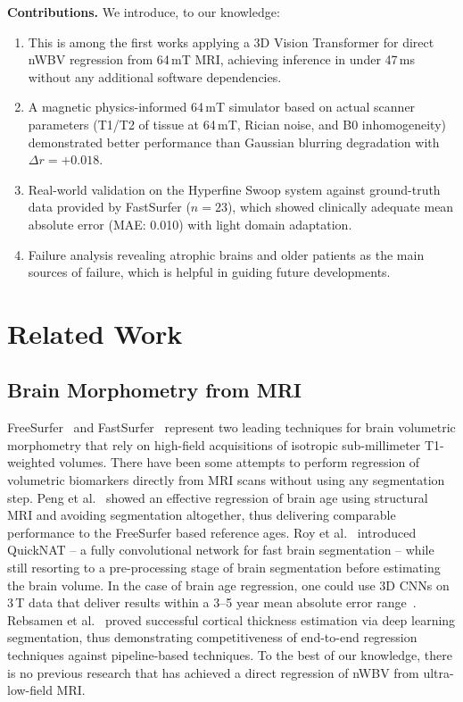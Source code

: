 \documentclass[12pt,a4paper]{article}
\begin{document}
\textbf{Contributions.} We introduce, to our knowledge:
\begin{enumerate}
  \item This is among the first works applying a 3D
        Vision Transformer for direct nWBV regression from 64\,mT MRI,
        achieving inference in under 47\,ms without any additional software
        dependencies.
  \item A magnetic physics-informed 64\,mT simulator based on actual scanner
        parameters (T1/T2 of tissue at 64\,mT, Rician noise, and B0
        inhomogeneity) demonstrated better performance than Gaussian blurring
        degradation with $\Delta r = +0.018$.
  \item Real-world validation on the Hyperfine Swoop system against
        ground-truth data provided by FastSurfer ($n=23$), which showed
        clinically adequate mean absolute error (MAE: 0.010) with light
        domain adaptation.
  \item Failure analysis revealing atrophic brains and older patients as the
        main sources of failure, which is helpful in guiding future
        developments.
\end{enumerate}

\section{Related Work}
\label{sec:related}

\subsection{Brain Morphometry from MRI}

FreeSurfer~\cite{fischl2012freesurfer} and
FastSurfer~\cite{henschel2020fastsurfer} represent two leading techniques for
brain volumetric morphometry that rely on high-field acquisitions of isotropic
sub-millimeter T1-weighted volumes. There have been some attempts to perform
regression of volumetric biomarkers directly from MRI scans without using any
segmentation step. Peng et al.~\cite{peng2021brain} showed an effective
regression of brain age using structural MRI and avoiding segmentation
altogether, thus delivering comparable performance to the FreeSurfer based
reference ages. Roy et al.~\cite{roy2019quicknat} introduced QuickNAT -- a
fully convolutional network for fast brain segmentation -- while still
resorting to a pre-processing stage of brain segmentation before estimating
the brain volume. In the case of brain age regression, one could use 3D CNNs
on 3\,T data that deliver results within a 3--5 year mean absolute error
range~\cite{cole2017predicting,jonsson2019brain}. Rebsamen et
al.~\cite{rebsamen2020cortical} proved successful cortical thickness estimation
via deep learning segmentation, thus demonstrating competitiveness of
end-to-end regression techniques against pipeline-based techniques. To the
best of our knowledge, there is no previous research that has achieved a
direct regression of nWBV from ultra-low-field MRI.
\end{document}

